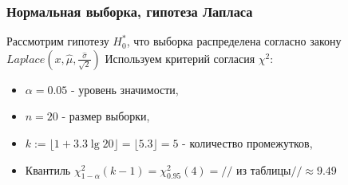\documentclass[../body.tex]{subfiles}
\begin{document}
		\subsubsection{Нормальная выборка, гипотеза Лапласа}
		Рассмотрим гипотезу $H_0^*$, что выборка распределена согласно закону $Laplace(x, \hat{\mu},\frac{\hat{\sigma}}{\sqrt2} )$
		Используем критерий согласия $\chi^2$:
		\begin{itemize}
			\item $\alpha = 0.05$ - уровень значимости,
			\item $n = 20$ - размер выборки,
			\item $k := \lfloor1+3.3\lg 20\rfloor = \lfloor5.3\rfloor = 5$ - количество промежутков,
			\item Квантиль $\chi_{1 - \alpha}^2(k - 1) = \chi_{0.95}^2(4) = //$ из таблицы\cite[с.~358]{math}$// \approx 9.49$
		\end{itemize}
\end{document}
